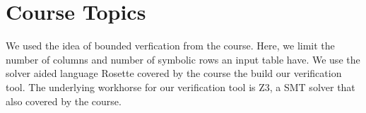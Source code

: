 \section{Course Topics}

We used the idea of bounded verfication from the course. Here, we 
limit the number of columns and number of symbolic rows an input
table have. We use the solver aided language Rosette covered by 
the course the build our verification tool. The underlying workhorse
for our verification tool is Z3, a SMT solver that also covered by 
the course.

